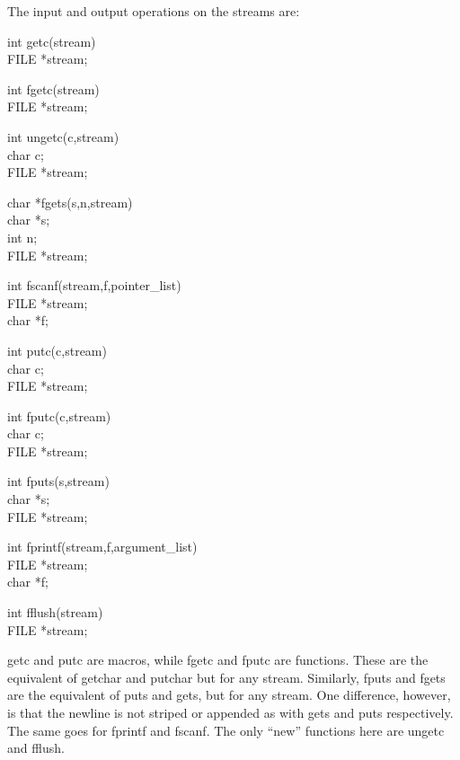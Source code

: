      The input and output operations on the streams are:
\begin{code}
       int getc(stream) \\
       FILE *stream;	\addVspace

       int fgetc(stream)   \\
       FILE *stream;	       \addVspace

       int ungetc(c,stream)	     \\
       char c;				 \\
       FILE *stream;			   \addVspace

       char *fgets(s,n,stream)		 \\
       char *s;				 \\
       int n;				 \\
       FILE *stream;			 \addVspace

       int fscanf(stream,f,{\ms pointer\_list\/}) \\
       FILE *stream;				\\
       char *f;				       \addVspace

       int putc(c,stream)		       \\
       char c;				       \\
       FILE *stream;			       \addVspace

       int fputc(c,stream)		       \\
       char c;				       \\
       FILE *stream;			       \addVspace

       int fputs(s,stream)			\\
       char *s;					 \\
       FILE *stream;				 \addVspace

       int fprintf(stream,f,{\ms argument\_list\/})  \\
       FILE *stream;				   \\
       char *f;					   \addVspace

       int fflush(stream)			   \\
       FILE *stream;
\end{code}
\noindent
     {\cd getc} and  {\cd putc} are macros, while {\cd fgetc} and {\cd
fputc} are functions. These are the equivalent of {\cd getchar} and
{\cd putchar} but for any stream. Similarly, {\cd fputs} and {\cd
fgets} are  the equivalent  of {\cd puts} and {\cd gets}, but for any
stream. One difference, however, is that the newline is not striped
or appended as with {\cd gets} and {\cd puts} respectively.  
The same goes for {\cd fprintf} and {\cd fscanf}. The only
``new'' functions here are {\cd ungetc} and {\cd fflush}.

